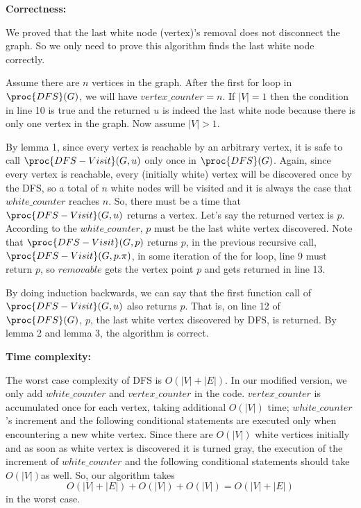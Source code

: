 \documentclass[11pt, answers]{exam}
\theoremstyle{plain}
\theoremstyle{definition}
\begin{document}
\begin{questions}
\begin{solution}
\textbf{Correctness:}

We proved that the last white node (vertex)'s removal does not disconnect the graph. So we only need to prove this algorithm finds the last white node correctly.

Assume there are $n$ vertices in the graph. After the first for loop in $\proc{DFS}(G)$, we will have $vertex\_counter = n$. If $|V| = 1$ then the condition in line 10 is true and the returned $u$ is indeed the last white node because there is only one vertex in the graph. Now assume $|V|>1$.

By lemma 1, since every vertex is reachable by an arbitrary vertex, it is safe to call $\proc{DFS-Visit}(G,u)$ only once in $\proc{DFS}(G)$. Again, since every vertex is reachable, every (initially white) vertex will be discovered once by the DFS, so a total of $n$ white nodes will be visited and it is always the case that $white\_counter$ reaches $n$. So, there must be a time that $\proc{DFS-Visit}(G,u)$ returns a vertex. Let's say the returned vertex is $p$. According to the $white\_counter$, $p$ must be the last white vertex discovered. Note that $\proc{DFS-Visit}(G,p)$ returns $p$, in the previous recursive call, $\proc{DFS-Visit}(G,p.\pi)$, in some iteration of the for loop, line 9 must return $p$, so $removable$ gets the vertex point $p$ and gets returned in line 13.

By doing induction backwards, we can say that the first function call of $\proc{DFS-Visit}(G,u)$ also returns $p$. That is, on line 12 of $\proc{DFS}(G)$, $p$, the last white vertex discovered by DFS, is returned. By lemma 2 and lemma 3, the algorithm is correct.

\textbf{Time complexity:}

The worst case complexity of DFS is $O(|V|+|E|)$. In our modified version, we only add $white\_counter$ and $vertex\_counter$ in the code. $vertex\_counter$ is accumulated once for each vertex, taking additional $O(|V|)$ time; $white\_counter$'s increment and the following conditional statements are executed only when encountering a new white vertex. Since there are $O(|V|)$ white vertices initially and as soon as white vertex is discovered it is turned gray, the execution of the increment of $white\_counter$ and the following conditional statements should take $O(|V|)$as well. So, our algorithm takes $$O(|V|+|E|)+O(|V|)+O(|V|)=O(|V|+|E|)$$ in the worst case.

\end{solution}


\end{questions}
\end{document}
